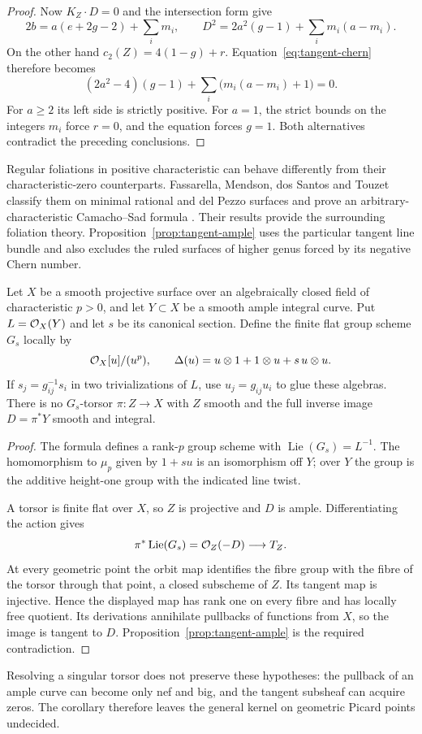 \begin{proof}
Now $K_Z\cdot D=0$ and the intersection form give
\[
 2b=a(e+2g-2)+\sum_i m_i,\qquad
 D^2=2a^2(g-1)+\sum_i m_i(a-m_i).
\]
On the other hand $c_2(Z)=4(1-g)+r$. Equation~\eqref{eq:tangent-chern} therefore becomes
\[
 (2a^2-4)(g-1)+\sum_i\bigl(m_i(a-m_i)+1\bigr)=0.
\]
For $a\geq2$ its left side is strictly positive. For $a=1$, the strict bounds on the integers $m_i$ force $r=0$, and the equation forces $g=1$. Both alternatives contradict the preceding conclusions.
\end{proof}

Regular foliations in positive characteristic can behave differently from their characteristic-zero counterparts. Fassarella, Mendson, dos Santos and Touzet classify them on minimal rational and del Pezzo surfaces and prove an arbitrary-characteristic Camacho--Sad formula \cite[Theorems~1.1--1.2 and 2.8]{FMST}. Their results provide the surrounding foliation theory. Proposition~\ref{prop:tangent-ample} uses the particular tangent line bundle and also excludes the ruled surfaces of higher genus forced by its negative Chern number.

\begin{corollary}\label{cor:smooth-torsor}
Let $X$ be a smooth projective surface over an algebraically closed field of characteristic $p>0$, and let $Y\subset X$ be a smooth ample integral curve. Put $L=\mathcal O_X(Y)$ and let $s$ be its canonical section. Define the finite flat group scheme $G_s$ locally by
\[
 \mathcal O_X[u]/(u^p),\qquad
 \Delta(u)=u\otimes1+1\otimes u+s\,u\otimes u.
\]
If $s_j=g_{ij}^{-1}s_i$ in two trivializations of $L$, use $u_j=g_{ij}u_i$ to glue these algebras. There is no $G_s$-torsor $\pi:Z\to X$ with $Z$ smooth and the full inverse image $D=\pi^*Y$ smooth and integral.
\end{corollary}

\begin{proof}
The formula defines a rank-$p$ group scheme with $\operatorname{Lie}(G_s)=L^{-1}$. The homomorphism to $\mu_p$ given by $1+su$ is an isomorphism off $Y$; over $Y$ the group is the additive height-one group with the indicated line twist.

A torsor is finite flat over $X$, so $Z$ is projective and $D$ is ample. Differentiating the action gives
\[
 \pi^*\operatorname{Lie}(G_s)=\mathcal O_Z(-D)\longrightarrow T_Z.
\]
At every geometric point the orbit map identifies the fibre group with the fibre of the torsor through that point, a closed subscheme of $Z$. Its tangent map is injective. Hence the displayed map has rank one on every fibre and has locally free quotient. Its derivations annihilate pullbacks of functions from $X$, so the image is tangent to $D$. Proposition~\ref{prop:tangent-ample} is the required contradiction.
\end{proof}

Resolving a singular torsor does not preserve these hypotheses: the pullback of an ample curve can become only nef and big, and the tangent subsheaf can acquire zeros. The corollary therefore leaves the general kernel on geometric Picard points undecided.
